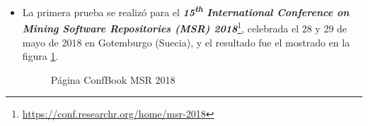 \documentclass[a4paper, 12pt]{book}
\begin{document}
\begin{itemize}
\item La primera prueba se realizó para el \textbf{\textit{15\textsuperscript{th} International Conference on Mining Software Repositories (MSR) 2018}}\footnote{\url{https://conf.researchr.org/home/msr-2018}}, celebrada el 28 y 29 de mayo de 2018 en Gotemburgo (Suecia), y el resultado fue el mostrado en la figura \ref{fig:imgMSR}.
\begin{figure}[h!]
	\centering
	\caption{Página ConfBook MSR 2018}
	\label{fig:imgMSR}
\end{figure}


\end{itemize}
\end{document}
